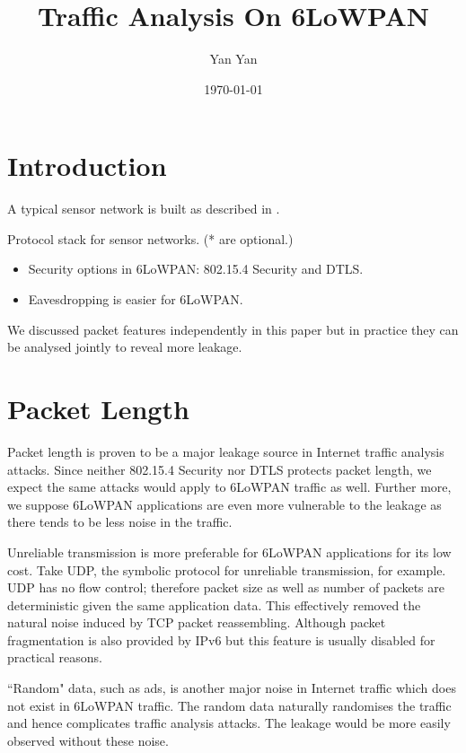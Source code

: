 \documentclass{article}
\title{Traffic Analysis On 6LoWPAN}
\author{Yan Yan}
\date{\today}
\begin{document}
\maketitle

\section{Introduction}

A typical sensor network is built as described in .

\begin{table}[!h]
	\centering
	
	\caption{Protocol stack for sensor networks. (* are optional.)\label{Protocols}}
\end{table}


\begin{itemize}
	\item Security options in 6LoWPAN: 802.15.4 Security and DTLS.
	\item Eavesdropping is easier for 6LoWPAN.
\end{itemize}

We discussed packet features independently in this paper but in practice they can be analysed jointly to reveal more leakage.

\section{Packet Length}
Packet length is proven to be a major leakage source in Internet traffic analysis attacks. Since neither 802.15.4 Security nor DTLS protects packet length, we expect the same attacks would apply to 6LoWPAN traffic as well. Further more, we suppose 6LoWPAN applications are even more vulnerable to the leakage as there tends to be less noise in the traffic.

Unreliable transmission is more preferable for 6LoWPAN applications for its low cost. Take UDP, the symbolic protocol for unreliable transmission, for example. UDP has no flow control; therefore packet size as well as number of packets are deterministic given the same application data. This effectively removed the natural noise induced by TCP packet reassembling. Although packet fragmentation is also provided by IPv6 but this feature is usually disabled for practical reasons.

``Random" data, such as ads, is another major noise in Internet traffic which does not exist in 6LoWPAN traffic. The random data naturally randomises the traffic and hence complicates traffic analysis attacks. The leakage would be more easily observed without these noise.
\end{document}
